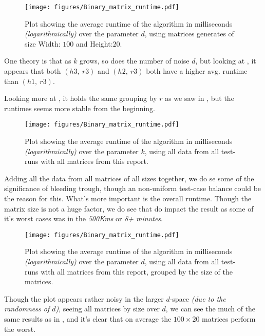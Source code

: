 \documentclass[a4paper]{article}
\begin{document}
\begin{figure}[H]
    \centering
    \texttt{[image: figures/Binary\_matrix\_runtime.pdf]}
    \caption{Plot showing the average runtime of the algorithm in milliseconds \textit{(logarithmically)}
        over the parameter $d$, using matrices generates of size Width: $100$ and Height:$20$.}
    \label{fig:res-100x20d}
\end{figure}

One theory is that as $k$ grows, so does the number of noise $d$, but looking at
, it appears that both $(h3,~r3)$ and $(h2,~r3)$ both have a higher avg.
runtime than $(h1,~r3)$.

Looking more at , it holds the same grouping by $r$ as we saw in ,
but the runtimes seems more stable from the beginning.

\begin{figure}[H]
    \centering
    \texttt{[image: figures/Binary\_matrix\_runtime.pdf]}
    \caption{Plot showing the average runtime of the algorithm in milliseconds \textit{(logarithmically)}
        over the parameter $k$, using all data from all test-runs with all matrices from this report.}
    \label{fig:res-all-data}
\end{figure}

Adding all the data from all matrices of all sizes together, we do se some of the significance of 
bleeding trough, though an non-uniform test-case balance could be the reason for this. What's more important is the
overall runtime. Though the matrix size is not a huge factor, we do see that  do impact
the result as some of it's worst cases was in the \textit{500Kms} or \textit{8+ minutes}.

\begin{figure}[H]
    \centering
    \texttt{[image: figures/Binary\_matrix\_runtime.pdf]}
    \caption{Plot showing the average runtime of the algorithm in milliseconds \textit{(logarithmically)}
        over the parameter $d$, using all data from all test-runs with all matrices from this report, grouped by
        the size of the matrices.}
    \label{fig:res-all-matrices-over-d}
\end{figure}

Though the plot appears rather noisy in the larger $d$-space \textit{(due to the randomness of $d$)},
seeing all matrices by size over $d$, we can see the much of the same results as
in , and it's clear that on average the $100 \times 20$ matrices perform
the worst.
\end{document}
